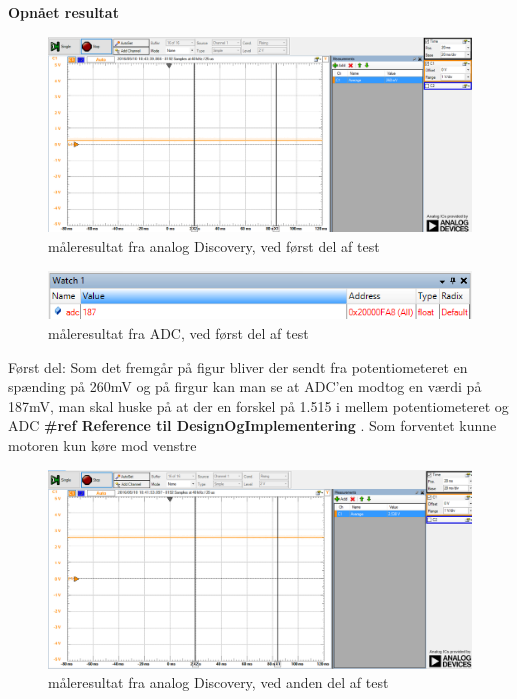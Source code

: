 \textbf{Opnået resultat}
\begin{figure}[H]
	\centering
	\includegraphics[width=\textwidth]{test/images/ModultestADC/260mVanalog}
	\caption{måleresultat fra analog Discovery, ved først del af test}
	\label{figure:analoglav}
\end{figure}
\begin{figure}[H]
	\centering
	\includegraphics[width=\textwidth]{test/images/ModultestADC/nedDebug}
	\caption{måleresultat fra ADC, ved først del af test}
	\label{figure: ADClav}
\end{figure}
Først del: Som det fremgår på figur \label{fig:analoglav} bliver der sendt fra potentiometeret  en spænding på 260mV og på firgur \label{fig:ADClav} kan man se at ADC’en modtog en værdi på 187mV, man skal huske på at der en forskel på 1.515 i mellem potentiometeret og ADC \textbf{\#ref Reference til DesignOgImplementering }. 
Som forventet kunne motoren kun køre mod venstre\\
\begin{figure}[H]
	\centering
	\includegraphics[width=\textwidth]{test/images/ModultestADC/2538Vanalog}
	\caption{måleresultat fra analog Discovery, ved anden del af test}
	\label{figure:analogmid}
\end{figure}
